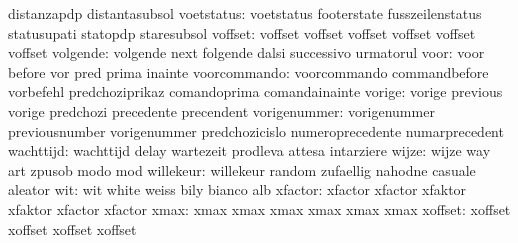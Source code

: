                            distanzapdp               distantasubsol
               voetstatus: voetstatus                footerstate
                           fusszeilenstatus          statusupati
                           statopdp                  staresubsol
                  voffset: voffset                   voffset
                           voffset                   voffset
                           voffset                   voffset
                 volgende: volgende                  next
                           folgende                  dalsi
                           successivo                urmatorul
                     voor: voor                      before
                           vor                       pred
                           prima                     inainte
             voorcommando: voorcommando              commandbefore
                           vorbefehl                 predchoziprikaz
                           comandoprima              comandainainte
                   vorige: vorige                    previous
                           vorige                    predchozi
                           precedente                precendent
             vorigenummer: vorigenummer              previousnumber
                           vorigenummer              predchozicislo
                           numeroprecedente          numarprecedent
                wachttijd: wachttijd                 delay
                           wartezeit                 prodleva
                           attesa                    intarziere
                    wijze: wijze                     way
                           art                       zpusob
                           modo                      mod
                willekeur: willekeur                 random
                           zufaellig                 nahodne
                           casuale                   aleator
                      wit: wit                       white
                           weiss                     bily
                           bianco                    alb
                  xfactor: xfactor                   xfactor
                           xfaktor                   xfaktor
                           xfactor                   xfactor %
                     xmax: xmax                      xmax
                           xmax                      xmax
                           xmax                      xmax %
                  xoffset: xoffset                   xoffset
                           xoffset                   xoffset
